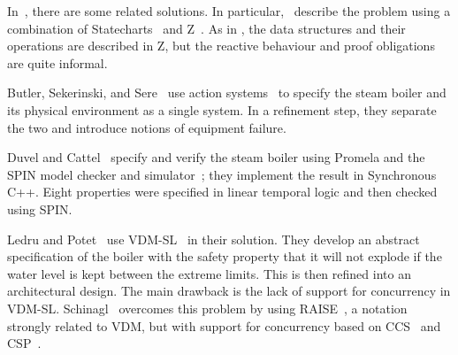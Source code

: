 \documentclass{report}
\begin{document}
In~\cite{abrial-borger-langmaack-96}, there are some related
solutions.  In particular,~\cite{bussow-weber-96} describe the problem
using a combination of Statecharts~\cite{harel-87, harel-gery-96} and
Z~\cite{spivey-92, woodcock-davies-96}.  As in \Circus, the data
structures and their operations are described in Z, but the reactive
behaviour and proof obligations are quite informal.

Butler, Sekerinski, and Sere~\cite{butler-sekerinski-sere-96} use
action systems~\cite{back-kurki-suonio-83} to specify the steam boiler
and its physical environment as a single system.  In a refinement
step, they separate the two and introduce notions of equipment
failure.

Duvel and Cattel~\cite{duval-cattel-96} specify and verify the steam
boiler using Promela and the SPIN model checker and
simulator~\cite{holzmann-91, holzmann-93, holzmann-95}; they implement
the result in Synchronous C++.  Eight properties were specified in
linear temporal logic and then checked using SPIN.

Ledru and Potet~\cite{ledru-potet-96} use VDM-SL~\cite{jones-90,
  andrews-bruun-hansen-larsen-plat-95} in their solution.  They
develop an abstract specification of the boiler with the safety
property that it will not explode if the water level is kept between
the extreme limits.  This is then refined into an architectural
design.  The main drawback is the lack of support for concurrency in
VDM-SL.  Schinagl~\cite{schinagl-96} overcomes this problem by using
RAISE~\cite{raise-92}, a notation strongly related to VDM, but with
support for concurrency based on CCS~\cite{milner-89} and
CSP~\cite{hoare-85}.

\end{document}
